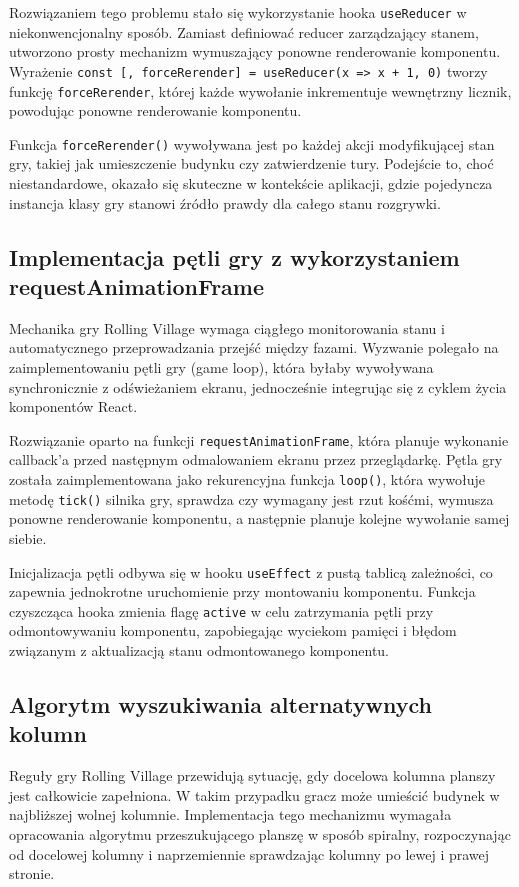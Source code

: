 \documentclass[12pt, a4paper]{article}
\begin{document}
Rozwiązaniem tego problemu stało się wykorzystanie hooka \texttt{useReducer} w niekonwencjonalny sposób. Zamiast definiować reducer zarządzający stanem, utworzono prosty mechanizm wymuszający ponowne renderowanie komponentu. Wyrażenie \texttt{const [, forceRerender] = useReducer(x => x + 1, 0)} tworzy funkcję \texttt{forceRerender}, której każde wywołanie inkrementuje wewnętrzny licznik, powodując ponowne renderowanie komponentu.

Funkcja \texttt{forceRerender()} wywoływana jest po każdej akcji modyfikującej stan gry, takiej jak umieszczenie budynku czy zatwierdzenie tury. Podejście to, choć niestandardowe, okazało się skuteczne w kontekście aplikacji, gdzie pojedyncza instancja klasy gry stanowi źródło prawdy dla całego stanu rozgrywki.

\subsection{Implementacja pętli gry z wykorzystaniem requestAnimationFrame}

Mechanika gry Rolling Village wymaga ciągłego monitorowania stanu i automatycznego przeprowadzania przejść między fazami. Wyzwanie polegało na zaimplementowaniu pętli gry (game loop), która byłaby wywoływana synchronicznie z odświeżaniem ekranu, jednocześnie integrując się z cyklem życia komponentów React.

Rozwiązanie oparto na funkcji \texttt{requestAnimationFrame}, która planuje wykonanie callback'a przed następnym odmalowaniem ekranu przez przeglądarkę. Pętla gry została zaimplementowana jako rekurencyjna funkcja \texttt{loop()}, która wywołuje metodę \texttt{tick()} silnika gry, sprawdza czy wymagany jest rzut kośćmi, wymusza ponowne renderowanie komponentu, a następnie planuje kolejne wywołanie samej siebie.

Inicjalizacja pętli odbywa się w hooku \texttt{useEffect} z pustą tablicą zależności, co zapewnia jednokrotne uruchomienie przy montowaniu komponentu. Funkcja czyszcząca hooka zmienia flagę \texttt{active} w celu zatrzymania pętli przy odmontowywaniu komponentu, zapobiegając wyciekom pamięci i błędom związanym z aktualizacją stanu odmontowanego komponentu.

\subsection{Algorytm wyszukiwania alternatywnych kolumn}

Reguły gry Rolling Village przewidują sytuację, gdy docelowa kolumna planszy jest całkowicie zapełniona. W takim przypadku gracz może umieścić budynek w najbliższej wolnej kolumnie. Implementacja tego mechanizmu wymagała opracowania algorytmu przeszukującego planszę w sposób spiralny, rozpoczynając od docelowej kolumny i naprzemiennie sprawdzając kolumny po lewej i prawej stronie.
\end{document}
